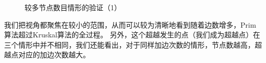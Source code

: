 \documentclass[UTF8]{ctexart}
\begin{document}
\begin{figure}[htbp]
    \caption{较多节点数目情形的验证（1）}
    \label{fig:2000&5000a}
\end{figure}

我们把视角都聚焦在较小的范围，从而可以较为清晰地看到随着边数增多，Prim算法超过Kruskal算法的全过程。 另外，这个超越发生的点（我们成为超越点）在三个情形中并不相同，我们还能看出，对于同样加边次数的情形，节点数越高，超越点对应的加边次数越大。 
\end{document}
